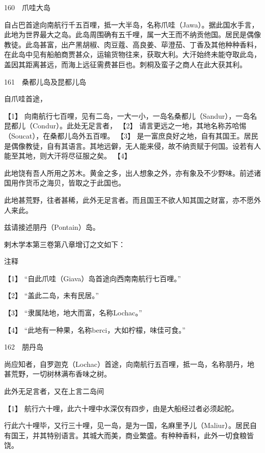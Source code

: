 \documentclass[12pt,UTF8]{ctexbook}
\begin{document}
160　爪哇大岛

自占巴首途向南航行千五百哩，抵一大半岛，名称爪哇（Jawa）。据此国水手言，此地为世界最大之岛。此岛周围确有五千哩，属一大王而不纳贡他国。居民是偶像教徒。此岛甚富，出产黑胡椒、肉豆蔻、高良姜、荜澄茄、丁香及其他种种香料，在此岛中见有船舶商贾甚众，运输货物往来，获取大利。大汗始终未能夺取此岛，盖因其距离甚远，而海上远征需费甚巨也。刺桐及蛮子之商人在此大获其利。





161　桑都儿岛及昆都儿岛

自爪哇首途，





【1】 向南航行七百哩，见有二岛，一大一小，一岛名桑都儿（Sandur），一岛名昆都儿（Condur）。此处无足言者， 【2】 请言更远之一地，其地名称苏哈惕（Soucat），在桑都儿岛外五百哩。 【3】 是一富庶良好之地，自有其国王。居民是偶像教徒，自有其语言。其地远僻，无人能来侵，故不纳贡赋于何国。设若有人能至其地，则大汗将尽征服之矣。 【4】

此地饶有吾人所用之苏木。黄金之多，出人想象之外，亦有象及不少野味。前述诸国用作货币之海贝，皆取之于此国也。

此地甚荒野，往者甚稀，此外无足言者。而且国王不欲人知其国之财富，亦不愿外人来此。

兹请接述朋丹（Pontain）岛。

剌木学本第三卷第八章增订之文如下：

注释

【1】 “自此爪哇（Giava）岛首途向西南南航行七百哩。”

【2】 “盖此二岛，未有民居。”

【3】 “隶属陆地，地大而富，名称Lochac。”

【4】 “此地有一种果，名称berci，大如柠檬，味佳可食。”





162　朋丹岛

尚应知者，自罗迦克（Lochac）首途，向南航行五百哩，抵一岛，名称朋丹，地甚荒野，一切树林满布香味之树。

此外无足言者，又在上言二岛间





【1】 航行六十哩，此六十哩中水深仅有四步，由是大船经过者必须起舵。

行此六十哩毕，又行三十哩，见一岛，是为一国，名麻里予儿（Maliur）。居民自有国王，并其特别语言。其城大而美，商业繁盛。有种种香料，此外一切食粮皆饶。
\end{document}
